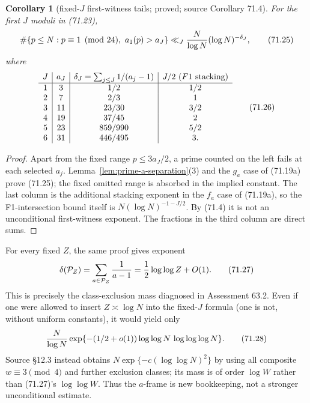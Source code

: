 \documentclass[10pt,reqno]{amsart}
\newtheorem{corollary}[theorem]{Corollary}
\theoremstyle{definition}
\newcommand{\1}{\mathbf 1}
\begin{document}
\begin{corollary}[fixed-$J$ first-witness tails; proved; source Corollary 71.4]\label{cor:fixed-J-tail}  For the first
$J$ moduli in (71.23),
\begin{equation}
 \#\{p\leq N:p\equiv1\pmod {24},\ a_1(p)>a_J\}
       \ll_J {N\over\log N}(\log N)^{-\delta_J},        \tag{71.25}
\end{equation}
where
\begin{equation}
\begin{array}{c|c|c|c}
J&a_J&\delta_J=\sum_{j\leq J}1/(a_j-1)&J/2\ (F1\hbox{ stacking})\\ \hline
1&3&1/2&1/2\\
2&7&2/3&1\\
3&11&23/30&3/2\\
4&19&37/45&2\\
5&23&859/990&5/2\\
6&31&446/495&3.
\end{array}                                                \tag{71.26}
\end{equation}

\end{corollary}
\begin{proof} Apart from the fixed range $p\leq3a_J/2$, a prime counted on the
left fails at each selected $a_j$.  Lemma~\ref{lem:prime-a-separation}(3) and the $g_a$ case of
(71.19a) prove (71.25); the fixed omitted range is absorbed in the implied
constant.
The last column is the additional stacking exponent in the $f_a$ case of
(71.19a), so the F1-intersection bound itself is
$N(\log N)^{-1-J/2}$.  By (71.4) it is not an unconditional first-witness
exponent.  The fractions in the third column are direct sums.
\end{proof}

For every fixed $Z$, the same proof gives exponent
\begin{equation}
 \delta(\mathcal P_Z)=\sum_{a\in\mathcal P_Z}{1\over a-1}
       ={1\over2}\log\log Z+O(1).                         \tag{71.27}
\end{equation}
This is precisely the class-exclusion mass diagnosed in Assessment 63.2.
Even if one were allowed to insert $Z\asymp\log N$ into the fixed-$J$
formula (one is not, without uniform constants), it would yield only
\begin{equation}
 {N\over\log N}
 \exp\{-(1/2+o(1))\log\log N\,\log\log\log N\}.          \tag{71.28}
\end{equation}
Source \S12.3 instead obtains $N\exp\{-c(\log\log N)^2\}$ by using
all composite $w\equiv3\pmod4$ and further exclusion classes; its mass is
of order $\log W$ rather than (71.27)'s $\log\log W$.  Thus the
$a$-frame is new bookkeeping, not a stronger unconditional estimate.
\end{document}
